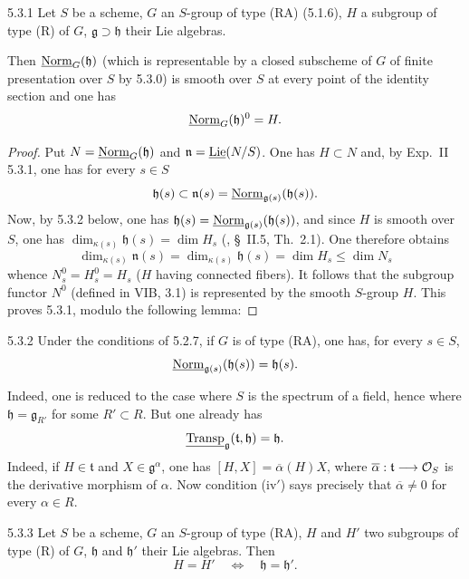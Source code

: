 \begin{proposition}{5.3.1}\label{XXII.5.3.1}
Let $S$ be a scheme, $G$ an $S$-group of type (RA) (5.1.6), $H$ a subgroup of type (R) of $G$, $\mathfrak g\supset\mathfrak h$ their Lie algebras.

Then $\underline{\mathrm{Norm}}_G(\mathfrak h)$ (which is representable by a closed subscheme of $G$ of finite presentation over $S$ by 5.3.0) is smooth over $S$ at every point of the identity section and one has
\[
\underline{\mathrm{Norm}}_G(\mathfrak h)^0=H.
\]
\end{proposition}
\begin{proof}
{\renewcommand{\thefootnote}{(30)}}%
Put $N=\underline{\mathrm{Norm}}_G(\mathfrak h)$ and $\mathfrak n=\underline{\operatorname{Lie}}(N/S)$. One has $H\subset N$ and, by Exp.~II 5.3.1, one has for every $s\in S$
\[
\mathfrak h(s)\subset\mathfrak n(s)=\underline{\mathrm{Norm}}_{\mathfrak g(s)}(\mathfrak h(s)).
\]
Now, by 5.3.2 below, one has $\mathfrak h(s)=\underline{\mathrm{Norm}}_{\mathfrak g(s)}(\mathfrak h(s))$, and since $H$ is smooth over $S$, one has $\dim_{\kappa(s)}\mathfrak h(s)=\dim H_s$ (\cf [DG70], \S~II.5, Th.~2.1). One therefore obtains
\[
\dim_{\kappa(s)}\mathfrak n(s)=\dim_{\kappa(s)}\mathfrak h(s)=\dim H_s\le\dim N_s
\]
whence $N_s^0=H_s^0=H_s$ ($H$ having connected fibers). It follows that the subgroup functor $N^0$ (defined in VIB, 3.1) is represented by the smooth $S$-group $H$. This proves 5.3.1, modulo the following lemma:
\end{proof}
\begin{lemma}{5.3.2}\label{XXII.5.3.2}
Under the conditions of 5.2.7, if $G$ is of type (RA), one has, for every $s\in S$,
\[
\underline{\mathrm{Norm}}_{\mathfrak g(s)}(\mathfrak h(s))=\mathfrak h(s).
\]
\end{lemma}
Indeed, one is reduced to the case where $S$ is the spectrum of a field, hence where $\mathfrak h=\mathfrak g_{R'}$ for some $R'\subset R$. But one already has
\[
\underline{\operatorname{Transp}}_{\mathfrak g}(\mathfrak t,\mathfrak h)=\mathfrak h.
\]
Indeed, if $H\in\mathfrak t$ and $X\in\mathfrak g^\alpha$, one has $[H,X]=\overline\alpha(H)X$, where $\overline\alpha:\mathfrak t\longrightarrow\mathcal{O}_S$ is the derivative morphism of $\alpha$. Now condition (iv$'$) says precisely that $\overline\alpha\ne0$ for every $\alpha\in R$.
\begin{corollary}{5.3.3}\label{XXII.5.3.3}
Let $S$ be a scheme, $G$ an $S$-group of type (RA), $H$ and $H'$ two subgroups of type (R) of $G$, $\mathfrak h$ and $\mathfrak h'$ their Lie algebras. Then
\[
H=H'\quad\Longleftrightarrow\quad\mathfrak h=\mathfrak h'.
\]
\end{corollary}
